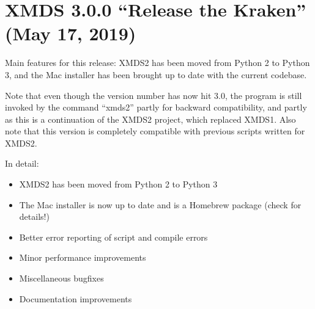 \documentclass[letterpaper,10pt,english]{sphinxmanual}
\begin{document}
\section{XMDS 3.0.0 “Release the Kraken” (May 17, 2019)}
\label{\detokenize{news:xmds-3-0-0-release-the-kraken-may-17-2019}}
\sphinxAtStartPar
Main features for this release: XMDS2 has been moved from Python 2 to Python 3, and the Mac installer has been brought up to date with the current codebase.

\sphinxAtStartPar
Note that even though the version number has now hit 3.0, the program is still invoked by the command “xmds2” \sphinxhyphen{} partly for backward compatibility, and partly as this is a continuation of the XMDS2 project, which replaced XMDS1. Also note that this version is completely compatible with previous scripts written for XMDS2.

\sphinxAtStartPar
In detail:
\begin{itemize}
\item {} 
\sphinxAtStartPar
XMDS2 has been moved from Python 2 to Python 3

\item {} 
\sphinxAtStartPar
The Mac installer is now up to date and is a Homebrew package (check {\hyperref[\detokenize{installation:installation}]{}} for details!)

\item {} 
\sphinxAtStartPar
Better error reporting of script and compile errors

\item {} 
\sphinxAtStartPar
Minor performance improvements

\item {} 
\sphinxAtStartPar
Miscellaneous bugfixes

\item {} 
\sphinxAtStartPar
Documentation improvements

\end{itemize}
\end{document}
